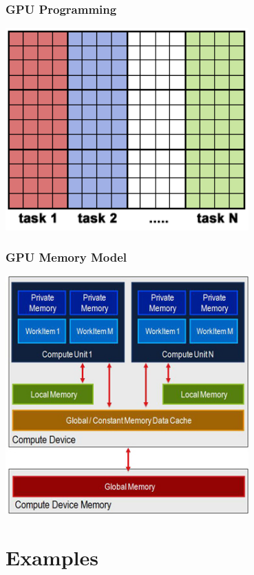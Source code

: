 \documentclass[t]{beamer}
\begin{document}
\begin{frame}
\frametitle{GPU Programming}
\begin{center}
  \includegraphics[width=0.7\textwidth]{img/array.png} 
\end{center}
\end{frame}

\begin{frame}
\frametitle{GPU Memory Model}
\begin{center}
  \includegraphics[width=0.7\textwidth]{img/OpenCLMemory.png} 
\end{center}
\end{frame}

\section{Examples}
\end{document}

